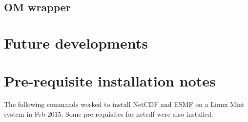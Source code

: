 \documentclass[12pt]{article}
\begin{document}
\subsection{OM wrapper}

\section{Future developments}

\appendix

\section{Pre-requisite installation notes}
\label{app:A}
The following commands worked to install NetCDF and ESMF on a Linux Mint system in Feb 2015.
Some pre-requisites for netcdf were also installed.
\end{document}
